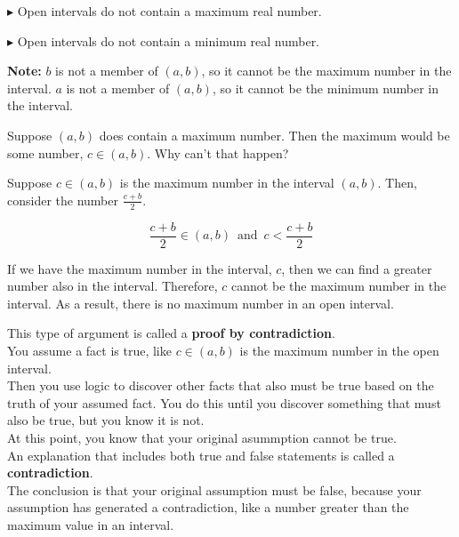 \documentclass{ximera}
\begin{document}
$\blacktriangleright$ Open intervals do not contain a maximum real number.

$\blacktriangleright$ Open intervals do not contain a minimum real number.

\textbf{Note:} $b$ is not a member of $(a,b)$, so it cannot be the maximum number in the interval.    $a$ is not a member of $(a,b)$, so it cannot be the minimum number in the interval.   


\begin{explanation}

Suppose $(a,b)$ does contain a maximum number. Then the maximum would be some number, $c \in (a,b)$.  Why can't that happen?  


Suppose $c \in (a,b)$ is the maximum number in the interval $(a,b)$.  Then, consider the number  $\frac{c+b}{2}$.   

\[  \frac{c+b}{2} \in (a,b)  \, \text{ and } \,  c < \frac{c+b}{2} \]  


If we have the maximum number in the interval, $c$, then we can find a greater number also in the interval. Therefore, $c$ cannot be the maximum number in the interval.  As a result, there is no maximum number in an open interval. \\


\end{explanation}





\begin{paradox}

This type of argument is called a \textbf{proof by contradiction}.   \\

You assume a fact is true, like $c \in (a,b)$ is the maximum number in the open interval.  \\

Then you use logic to discover other facts that also must be true based on the truth of your assumed fact.  You do this until you discover something that must also be true, but you know it is not. \\

At this point, you know that your original asummption cannot be true. \\

An explanation that includes both true and false statements is called a \textbf{contradiction}. \\

The conclusion is that your original assumption must be false, because your assumption has generated a contradiction, like a number greater than the maximum value in an interval.


\end{paradox}
\end{document}

